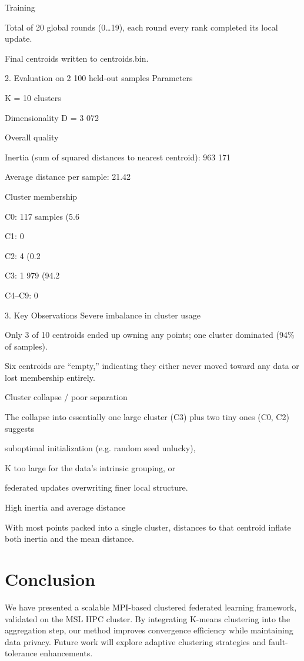 Training

Total of 20 global rounds (0…19), each round every rank completed its local update.

Final centroids written to centroids.bin.

2. Evaluation on 2 100 held-out samples
Parameters

K = 10 clusters

Dimensionality D = 3 072

Overall quality

Inertia (sum of squared distances to nearest centroid): 963 171

Average distance per sample: 21.42

Cluster membership

C0: 117 samples (5.6 %

C1: 0

C2: 4 (0.2 %

C3: 1 979 (94.2 %

C4–C9: 0

3. Key Observations
Severe imbalance in cluster usage

Only 3 of 10 centroids ended up owning any points; one cluster dominated (94\% of samples).

Six centroids are “empty,” indicating they either never moved toward any data or lost membership entirely.

Cluster collapse / poor separation

The collapse into essentially one large cluster (C3) plus two tiny ones (C0, C2) suggests

suboptimal initialization (e.g. random seed unlucky),

K too large for the data’s intrinsic grouping, or

federated updates overwriting finer local structure.

High inertia and average distance

With most points packed into a single cluster, distances to that centroid inflate both inertia and the mean distance.

\section{Conclusion}
We have presented a scalable MPI-based clustered federated learning framework, validated on the MSL HPC cluster. By integrating K-means clustering into the aggregation step, our method improves convergence efficiency while maintaining data privacy. Future work will explore adaptive clustering strategies and fault-tolerance enhancements.

